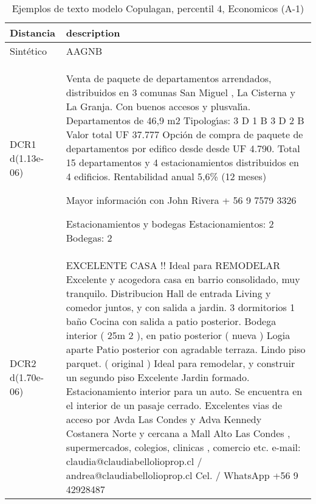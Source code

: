 \begin{table}[H]
\centering
\fontsize{10}{14}\selectfont
\caption{Ejemplos de texto modelo Copulagan, percentil 4, Economicos (A-1)}
\label{table-example-economicos-a-1-copulagan-4p-text}
\begin{tabular}{|l|m{35em}|}
\hline
\rowcolor[gray]{0.8}
Distancia & description \\
\hline Sintético & AAGNB \\
\hline DCR1 d(1.13e-06) & Venta de paquete de departamentos arrendados, distribuidos en 3 comunas San Miguel , La Cisterna y La Granja.
Con buenos accesos y plusval{\'\i}a.
Departamentos de 46,9 m2
Tipolog{\'\i}as:
3 D 1 B
3 D 2 B
Valor total UF 37.777
Opci\'on de compra de paquete de departamentos por edifico desde desde UF 4.790.
Total 15 departamentos y 4 estacionamientos distribuidos en 4 edificios.
Rentabilidad anual 5,6\% (12 meses)

Mayor informaci\'on con John Rivera + 56 9 7579 3326

Estacionamientos y bodegas 
 Estacionamientos: 2
Bodegas: 2 \\
\hline DCR2 d(1.70e-06) & EXCELENTE CASA !! Ideal para REMODELAR  Excelente y acogedora casa en barrio consolidado, muy tranquilo. Distribucion Hall de entrada  Living y comedor juntos, y con salida a jardin. 3 dormitorios  1 ba\~no Cocina con salida a patio posterior. Bodega interior ( 25m 2 ), en patio posterior ( nueva ) Logia aparte Patio posterior con agradable terraza. Lindo piso parquet. ( original ) Ideal para remodelar, y construir un segundo piso  Excelente Jardin formado. Estacionamiento interior para un auto. Se encuentra en el interior de un pasaje cerrado. Excelentes vias de acceso por Avda Las Condes y Adva Kennedy Costanera Norte y cercana a Mall Alto Las Condes , supermercados, colegios, clinicas , comercio etc.  e-mail: claudia@claudiabellolioprop.cl / andrea@claudiabellolioprop.cl  Cel. / WhatsApp +56 9 42928487 \\
\hline
\end{tabular}
\end{table}
